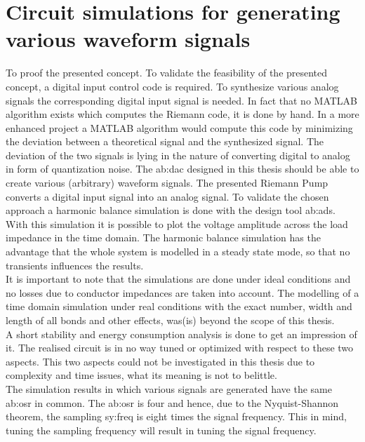 \chapter{Circuit simulations for generating various waveform signals}
To proof the presented concept.
To validate the feasibility of the presented concept, a digital input control code is required.
To synthesize various analog signals the corresponding digital input signal is needed. 
In fact that no MATLAB algorithm exists which computes the Riemann code, it is done by hand. 
In a more enhanced project a MATLAB algorithm would compute this code by minimizing the deviation between a theoretical signal and the synthesized signal.
 The deviation of the two signals is lying in the nature of converting digital to analog in form of quantization noise.
The \gls{ab:dac} designed in this thesis should be able to create various (arbitrary) waveform signals.
The presented Riemann Pump converts a digital input signal into an analog signal.
 To validate the chosen approach a harmonic balance simulation is done with the design tool \gls{ab:ads}.
  With this simulation it is possible to plot the voltage amplitude across the load impedance in the time domain.
   The harmonic balance simulation has the advantage that the whole system is modelled in a steady state mode, so that no transients influences the results.\\
    It is important to note that the simulations are done under ideal conditions and no losses due to conductor impedances are taken into account.
    The modelling of a time domain simulation under real conditions with the exact number, width and length of all bonds and other effects, was(is) beyond the scope of this thesis.\\
    A short stability and energy consumption analysis is done to get an impression of it. 
    The realised circuit is in no way tuned or optimized with respect to these two aspects.
     This two aspects could not be investigated in this thesis due to complexity and time issues, what its meaning is not to belittle.\\
    
The simulation results in which various signals are generated have the same \gls{ab:osr} in common.
The \gls{ab:osr} is four and hence, due to the Nyquist-Shannon theorem, the sampling \gls{sy:freq} is eight times the signal frequency.
This in mind, tuning the sampling frequency will result in tuning the signal frequency. 

